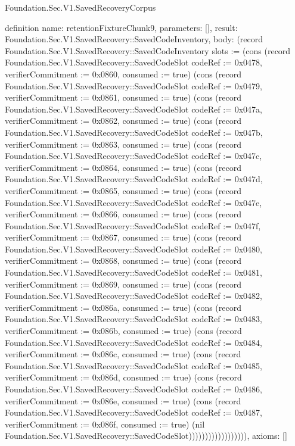 \begin{lexlean}{Foundation.Sec.V1.SavedRecoveryCorpus}
\begin{semanticmodule}
definition{
  name: retentionFixtureChunk9,
  parameters: [],
  result: Foundation.Sec.V1.SavedRecovery::SavedCodeInventory,
  body: (record Foundation.Sec.V1.SavedRecovery::SavedCodeInventory {slots := (cons (record Foundation.Sec.V1.SavedRecovery::SavedCodeSlot {codeRef := 0x0478, verifierCommitment := 0x0860, consumed := true}) (cons (record Foundation.Sec.V1.SavedRecovery::SavedCodeSlot {codeRef := 0x0479, verifierCommitment := 0x0861, consumed := true}) (cons (record Foundation.Sec.V1.SavedRecovery::SavedCodeSlot {codeRef := 0x047a, verifierCommitment := 0x0862, consumed := true}) (cons (record Foundation.Sec.V1.SavedRecovery::SavedCodeSlot {codeRef := 0x047b, verifierCommitment := 0x0863, consumed := true}) (cons (record Foundation.Sec.V1.SavedRecovery::SavedCodeSlot {codeRef := 0x047c, verifierCommitment := 0x0864, consumed := true}) (cons (record Foundation.Sec.V1.SavedRecovery::SavedCodeSlot {codeRef := 0x047d, verifierCommitment := 0x0865, consumed := true}) (cons (record Foundation.Sec.V1.SavedRecovery::SavedCodeSlot {codeRef := 0x047e, verifierCommitment := 0x0866, consumed := true}) (cons (record Foundation.Sec.V1.SavedRecovery::SavedCodeSlot {codeRef := 0x047f, verifierCommitment := 0x0867, consumed := true}) (cons (record Foundation.Sec.V1.SavedRecovery::SavedCodeSlot {codeRef := 0x0480, verifierCommitment := 0x0868, consumed := true}) (cons (record Foundation.Sec.V1.SavedRecovery::SavedCodeSlot {codeRef := 0x0481, verifierCommitment := 0x0869, consumed := true}) (cons (record Foundation.Sec.V1.SavedRecovery::SavedCodeSlot {codeRef := 0x0482, verifierCommitment := 0x086a, consumed := true}) (cons (record Foundation.Sec.V1.SavedRecovery::SavedCodeSlot {codeRef := 0x0483, verifierCommitment := 0x086b, consumed := true}) (cons (record Foundation.Sec.V1.SavedRecovery::SavedCodeSlot {codeRef := 0x0484, verifierCommitment := 0x086c, consumed := true}) (cons (record Foundation.Sec.V1.SavedRecovery::SavedCodeSlot {codeRef := 0x0485, verifierCommitment := 0x086d, consumed := true}) (cons (record Foundation.Sec.V1.SavedRecovery::SavedCodeSlot {codeRef := 0x0486, verifierCommitment := 0x086e, consumed := true}) (cons (record Foundation.Sec.V1.SavedRecovery::SavedCodeSlot {codeRef := 0x0487, verifierCommitment := 0x086f, consumed := true}) (nil Foundation.Sec.V1.SavedRecovery::SavedCodeSlot)))))))))))))))))}),
  axioms: []
}


\end{semanticmodule}
\end{lexlean}
